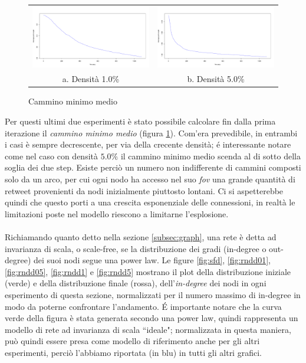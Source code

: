 \documentclass[a4paper,12pt]{article}
\begin{document}
\begin{figure}[H]
\begin{tabular}{cc}
  \includegraphics[width=81mm]{images/spath_1000_rnd_1080_1_0.pdf} &   \includegraphics[width=81mm]{images/spath_1000_rnd_1080_5_0.pdf} \\
a. Densità 1.0\% & b. Densità 5.0\% \\[6pt]
\end{tabular}
\centering
\caption{Cammino minimo medio}
\label{fig:spath}
\end{figure}
Per questi ultimi due esperimenti è stato possibile calcolare fin dalla prima iterazione il \textit{cammino minimo medio} (figura \ref{fig:spath}). Com'era prevedibile, in entrambi i casi è sempre decrescente, per via della crecente densità; é interessante notare come nel caso con densità $5.0\%$ il cammino minimo medio scenda al di sotto della soglia dei due step. Esiste perciò un numero non indifferente di cammini composti solo da un arco, per cui ogni nodo ha accesso nel suo \textit{fov} una grande quantità di retweet provenienti da nodi inizialmente piuttosto lontani. Ci si aspetterebbe quindi che questo porti a una crescita esponenziale delle connessioni, in realtà le limitazioni poste nel modello riescono a limitarne l'esplosione. \\ \\
Richiamando quanto detto nella sezione \ref{subsec:graph}, una rete è detta ad invarianza di scala, o scale-free, se la distribuzione dei gradi (in-degree o out-degree) dei suoi nodi segue una power law. Le figure \ref{fig:sfd}, \ref{fig:rndd01}, \ref{fig:rndd05}, \ref{fig:rndd1} e \ref{fig:rndd5} mostrano il plot della distribuzione iniziale (verde) e della distribuzione finale (rossa), dell'\textit{in-degree} dei nodi in ogni esperimento di questa sezione, normalizzati per il numero massimo di in-degree in modo da poterne confrontare l'andamento. \'E importante notare che la curva verde della figura  è stata generata secondo una power law, quindi rappresenta un modello di rete ad invarianza di scala ``ideale"; normalizzata in questa maniera, può quindi essere presa come modello di riferimento anche per gli altri esperimenti, perciò l'abbiamo riportata (in blu) in tutti gli altri grafici. \\ \\
\end{document}
